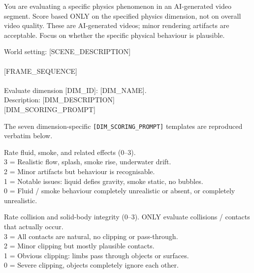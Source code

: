 \begin{tcolorbox}[d5box, title={Causal Fidelity --- Track 2: Scene-Aware Physics Dimensions (0--3, averaged)}]
\begin{tcolorbox}[systemprompt]
You are evaluating a specific physics phenomenon in an AI-generated video segment. Score based ONLY on the specified physics dimension, not on overall video quality. These are AI-generated videos; minor rendering artifacts are acceptable. Focus on whether the specific physical behaviour is plausible.
\end{tcolorbox}
\vspace{4pt}
\begin{tcolorbox}[userprompt]
World setting: [SCENE\_DESCRIPTION]\\
\\
\mbox{[FRAME\_SEQUENCE]}\\
\\
Evaluate dimension [DIM\_ID]: [DIM\_NAME].\\
Description: [DIM\_DESCRIPTION]\\
\mbox{[DIM\_SCORING\_PROMPT]}
\end{tcolorbox}
\vspace{4pt}
The seven dimension-specific \texttt{[DIM\_SCORING\_PROMPT]} templates are reproduced verbatim below.
\end{tcolorbox}

\vspace{6pt}

\begin{tcolorbox}[d5box, title={Track 2 Rubric --- Fluid \& Smoke}]
\ttfamily\scriptsize
Rate fluid, smoke, and related effects (0--3).\\
3 = Realistic flow, splash, smoke rise, underwater drift.\\
2 = Minor artifacts but behaviour is recognisable.\\
1 = Notable issues: liquid defies gravity, smoke static, no bubbles.\\
0 = Fluid / smoke behaviour completely unrealistic or absent, or completely unrealistic.
\end{tcolorbox}

\vspace{4pt}

\begin{tcolorbox}[d5box, title={Track 2 Rubric --- Collision \& Clipping}]
\ttfamily\scriptsize
Rate collision and solid-body integrity (0--3). ONLY evaluate collisions / contacts that actually occur.\\
3 = All contacts are natural, no clipping or pass-through.\\
2 = Minor clipping but mostly plausible contacts.\\
1 = Obvious clipping: limbs pass through objects or surfaces.\\
0 = Severe clipping, objects completely ignore each other.
\end{tcolorbox}


